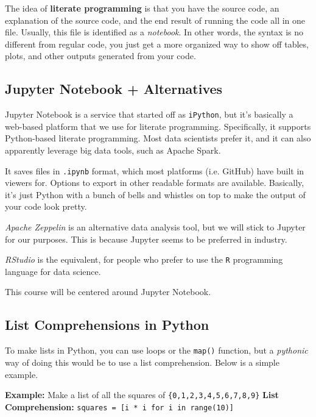 \documentclass[english, 10pt]{article}
\begin{document}
The idea of \textbf{literate programming} is that you have the source code, an explanation of the source code, and the end result of running the code all in one file. Usually, this file is identified as a \textit{notebook}. In other words, the syntax is no different from regular code, you just get a more organized way to show off tables, plots, and other outputs generated from your code.

\subsection{Jupyter Notebook + Alternatives}

Jupyter Notebook is a service that started off as \texttt{iPython}, but it's basically a web-based platform that we use for literate programming. Specifically, it supports Python-based literate programming. Most data scientists prefer it, and it can also apparently leverage big data tools, such as Apache Spark.\newline

It saves files in \texttt{.ipynb} format, which most platforms (i.e. GitHub) have built in viewers for. Options to export in other readable formats are available. Basically, it's just Python with a bunch of bells and whistles on top to make the output of your code look pretty.\newline

\textit{Apache Zeppelin} is an alternative data analysis tool, but we will stick to Jupyter for our purposes. This is because Jupyter seems to be preferred in industry.\newline

\textit{RStudio} is the equivalent, for people who prefer to use the \texttt{R} programming language for data science.\newline

This course will be centered around Jupyter Notebook.

\subsection{List Comprehensions in Python}

To make lists in Python, you can use loops or the \texttt{map()} function, but a \textit{pythonic} way of doing this would be to use a list comprehension. Below is a simple example.\newline

\begin{myproof}
\textbf{Example:} Make a list of all the squares of \texttt{\{0,1,2,3,4,5,6,7,8,9\}}\newline\newline
\textbf{List Comprehension:}\newline
\texttt{squares = [i * i for i in range(10)]}
\end{myproof}
\end{document}
